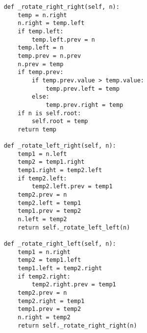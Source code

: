 \begin{lstlisting}
    def _rotate_right_right(self, n):
        temp = n.right
        n.right = temp.left
        if temp.left:
            temp.left.prev = n
        temp.left = n
        temp.prev = n.prev
        n.prev = temp
        if temp.prev:
            if temp.prev.value > temp.value:
                temp.prev.left = temp
            else:
                temp.prev.right = temp
        if n is self.root:
            self.root = temp
        return temp

    def _rotate_left_right(self, n):
        temp1 = n.left
        temp2 = temp1.right
        temp1.right = temp2.left
        if temp2.left:
            temp2.left.prev = temp1
        temp2.prev = n
        temp2.left = temp1
        temp1.prev = temp2
        n.left = temp2
        return self._rotate_left_left(n)

    def _rotate_right_left(self, n):
        temp1 = n.right
        temp2 = temp1.left
        temp1.left = temp2.right
        if temp2.right:
            temp2.right.prev = temp1
        temp2.prev = n
        temp2.right = temp1
        temp1.prev = temp2
        n.right = temp2
        return self._rotate_right_right(n)
\end{lstlisting}

